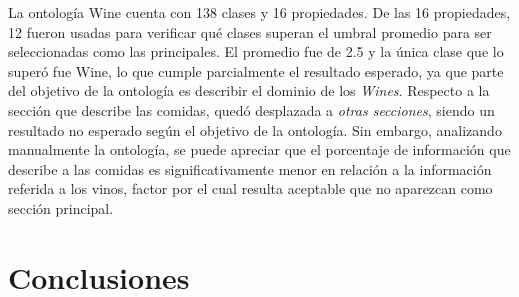 La ontología Wine cuenta con 138 clases y 16 propiedades. De las 16 propiedades, 12 fueron usadas para verificar qué clases superan el umbral promedio para ser seleccionadas como las principales. El promedio fue de 2.5 y la única clase que lo superó fue Wine, lo que cumple parcialmente el resultado esperado, ya que parte del objetivo de la ontología es describir el dominio de los \emph{Wines}. Respecto a la sección que describe las comidas, quedó desplazada a \emph{otras secciones}, siendo un resultado no esperado según el objetivo de la ontología. Sin embargo, analizando manualmente la ontología, se puede apreciar que el porcentaje de  información que describe a las comidas es significativamente menor en relación a la información referida a los vinos, factor por el cual resulta aceptable que no aparezcan como sección principal.


\section{Conclusiones}